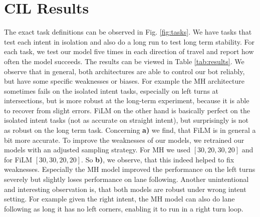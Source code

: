 \section{CIL Results}
\label{sec:results}

The exact task definitions can be observed in Fig. \ref{fig:tasks}. 
We have tasks that test each intent in isolation and also do a long run to test long term stability. 
For each task, we test our model five times in each direction of travel and report how often the model succeeds. 
The results can be viewed in Table \ref{tab:results}.
We observe that in general, both architectures are able to control our bot reliably, but have some specific weaknesses or biases. 
For example the MH architecture sometimes fails on the isolated intent tasks, especially on left turns at intersections, 
but is more robust at the long-term experiment, because it is able to recover from slight errors. 
FiLM on the other hand is basically perfect on the isolated intent tasks (not as accurate on straight intent), but surprisingly is not as robust on the long term task. 
Concerning \textbf{a)} we find, that FiLM is in general a bit more accurate. 
To improve the weaknesses of our models, we retrained our models with an adjusted sampling strategy. 
For MH we used $[30, 20, 30, 20]$ and for FiLM $[30, 30, 20, 20]$. 
So \textbf{b)}, we observe, that this indeed helped to fix weaknesses. 
Especially the MH model improved the performance on the left turns severely but slightly loses performance on lane following. 
Another unintentional and interesting observation is, that both models are robust under wrong intent setting. 
For example given the right intent, the MH model can also do lane following as long it has no left corners, enabling it to run in a right turn loop. 


